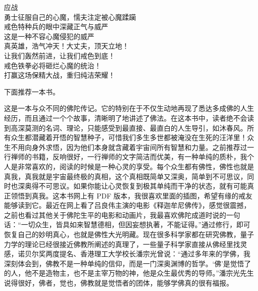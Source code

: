\begin{poem}[中国戒色力量]
\begin{multicols}{2}
\begin{center}
应战 \\ 勇士征服自己的心魔，懦夫注定被心魔蹂躏 \\ 戒色特种兵的眼中深藏正气与威严 \\ 这是一种不容心魔侵犯的威严 \\ 真英雄，浩气冲天！大丈夫，顶天立地！ \\ 让我们轰然前进，让我们戒色到底！ \\ 戒色铁拳必将砸烂心魔的统治！ \\ 打赢这场保精大战，重归纯洁荣耀！
        \end{center}
    \end{multicols}
\end{poem}

下面推荐一本书。

\begin{book}
    这是一本与众不同的佛陀传记。它的特别在于不仅生动地再现了悉达多成佛的人生经历，而且通过一个个故事，清晰明了地讲述了佛法。在这本书中，读者绝不会读到高深莫测的名词、理论，只能感受到最直接、最直白的人生导引，如沐春风。所有众生都潜藏着开悟的智慧种子，可惜我们多生多世都被淹没在生死的汪洋里！众生不用向身外求悟，因为他们本身就含藏着宇宙间所有智慧和力量。之前推荐过一行禅师的书籍，反响很好，一行禅师的文字简洁而优美，有一种单纯的质朴，我个人是非常喜欢的，阅读的时候是一种心灵的享受。每个众生都有佛性，佛性也就是真我，真我就是宇宙最终极的真相，这个真相既简单又深奥，简单到不可思议，同时也深奥得不可思议。如果你能让心灵恢复到极其单纯而干净的状态，就有可能真正领悟到真我。这本书网上有 PDF 版本，我很喜欢里面的插图，希望有缘的戒友能够读到它。最近在网上看了吕良伟主演的电影《释迦牟尼佛传》，感觉很震撼，之前也看过其他关于佛陀生平的电影和动画片，我最喜欢佛陀成道时说的一句话：“一切众生，皆具如来智慧德相，但因妄想执著，不能证得。”通过修行，即可恢复自己的妙明真心，也就是佛性大光明藏。现在很多科学家都在研究佛教，量子力学的理论已经很接近佛教所阐述的真理了，一些量子科学家直接从佛经里找灵感，诺贝尔奖两度提名、香港理工大学校长潘宗光曾说：“通过多年来的学佛，我深刻体会到，佛教不是一种单纯的信仰，而是一门深奥渊博的哲学。‘佛’是觉悟了的人，他不是造物主，也不是主宰万物的神，他是众生最优秀的导师。”潘宗光先生说得很好，佛者，觉也，佛教就是觉悟者的团体，能够学佛真的很有福报。
\end{book}
